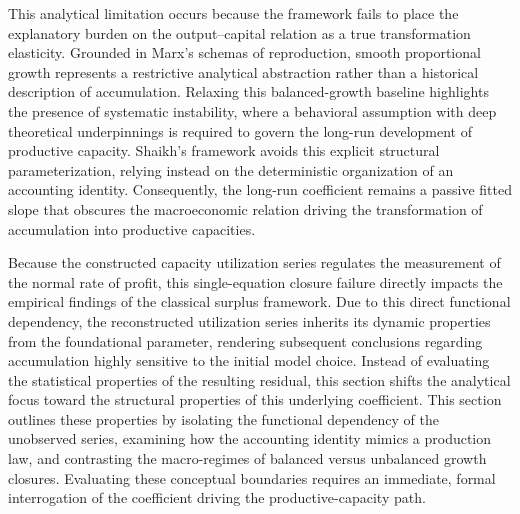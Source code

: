 \documentclass[11pt]{article}
\begin{document}
This analytical limitation occurs because the framework fails to place the explanatory burden on the output--capital relation as a true transformation elasticity. Grounded in Marx's schemas of reproduction, smooth proportional growth represents a restrictive analytical abstraction rather than a historical description of accumulation. Relaxing this balanced-growth baseline highlights the presence of systematic instability, where a behavioral assumption with deep theoretical underpinnings is required to govern the long-run development of productive capacity. Shaikh's framework avoids this explicit structural parameterization, relying instead on the deterministic organization of an accounting identity. Consequently, the long-run coefficient remains a passive fitted slope that obscures the macroeconomic relation driving the transformation of accumulation into productive capacities.

Because the constructed capacity utilization series regulates the measurement of the normal rate of profit, this single-equation closure failure directly impacts the empirical findings of the classical surplus framework. Due to this direct functional dependency, the reconstructed utilization series inherits its dynamic properties from the foundational parameter, rendering subsequent conclusions regarding accumulation highly sensitive to the initial model choice. Instead of evaluating the statistical properties of the resulting residual, this section shifts the analytical focus toward the structural properties of this underlying coefficient. This section outlines these properties by isolating the functional dependency of the unobserved series, examining how the accounting identity mimics a production law, and contrasting the macro-regimes of balanced versus unbalanced growth closures. Evaluating these conceptual boundaries requires an immediate, formal interrogation of the coefficient driving the productive-capacity path.
\end{document}
